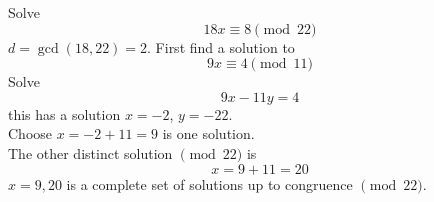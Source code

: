 \begin{theorem} 
        \begin{example}
            Solve \[ 18x\equiv 8\pmod{22} \]
            $d=\gcd(18,22)=2$. First find a solution to
            \[ 9x\equiv 4\pmod{11} \]
            Solve 
            \[ 9x-11y = 4\]
            this has a solution $x=-2$, $y=-22$. \\
            Choose $x=-2+11 = 9$ is one solution. \\
            The other distinct solution $\pmod{22}$ is 
            \[ x=9+11=20 \] 
            $x=9,20$ is a complete set of solutions up to congruence $\pmod{22}$.

        \end{example}

    \end{theorem}
